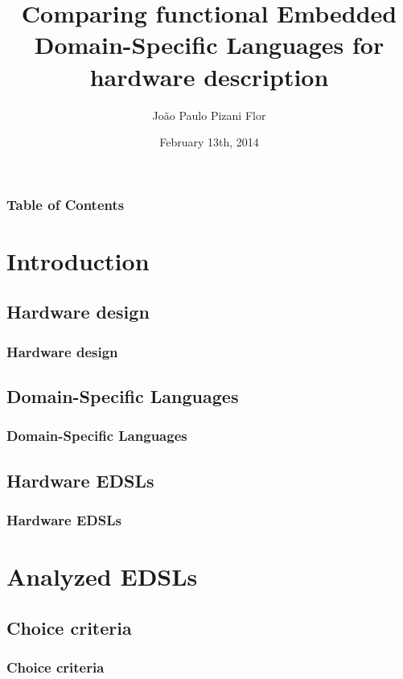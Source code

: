 \documentclass{beamer}
\title[Comparing functional EDSLs for hardware description]{Comparing functional Embedded Domain-Specific Languages for hardware description}
\date{February 13th, 2014}
\author[Pizani Flor]
{
    João Paulo Pizani Flor
}
\institute[Utrecht University]
{
    Department of Information and Computing Sciences,
    Utrecht University
}
\begin{document}
    \begin{frame}
        \titlepage
    \end{frame}

    \begin{frame}
        \frametitle{Table of Contents}
        \tableofcontents
    \end{frame}



    \section{Introduction}
    \label{sec:introduction}
        \frame{\sectionpage}

        \subsection{Hardware design}
        \label{subsec:hardware-design}
            \begin{frame}
                \frametitle{Hardware design}
            \end{frame}

        \subsection{Domain-Specific Languages}
        \label{subsec:domain-specific-languages}
            \begin{frame}
                \frametitle{Domain-Specific Languages}
            \end{frame}

        \subsection{Hardware EDSLs}
        \label{subsec:hardware-edsls}
            \begin{frame}
                \frametitle{Hardware EDSLs}
            \end{frame}


    \section{Analyzed EDSLs}
    \label{sec:analyzed-edsls}
        \frame{\sectionpage}

        \subsection{Choice criteria}
        \label{subsec:edsls-choice-criteria}
            \begin{frame}
                \frametitle{Choice criteria}
            \end{frame}
\end{document}
